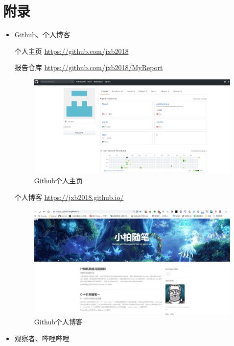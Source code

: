 \documentclass{article}
\begin{document}
\section{附录}
\begin{itemize}
    \item Github、个人博客\par
    个人主页  
    \url{https://github.com/jxb2018}\par
    报告仓库 
    \url{ https://github.com/jxb2018/MyReport}\par
    \begin{figure}[ht]
        \centering
        \includegraphics[scale=0.35]{github.jpg}
        \caption{Github个人主页}
        \label{fig:label}
        \end{figure}
    个人博客 
    \url{https://jxb2018.github.io/}\par
    \begin{figure}[ht]
        \centering
        \includegraphics[scale=0.35]{gerenboke.jpg}
        \caption{Github个人博客}
        \label{fig:label}
        \end{figure}
    \newpage
    \item 观察者、哔哩哔哩
    \begin{figure}[ht]

\end{figure}
\end{itemize}
\end{document}
